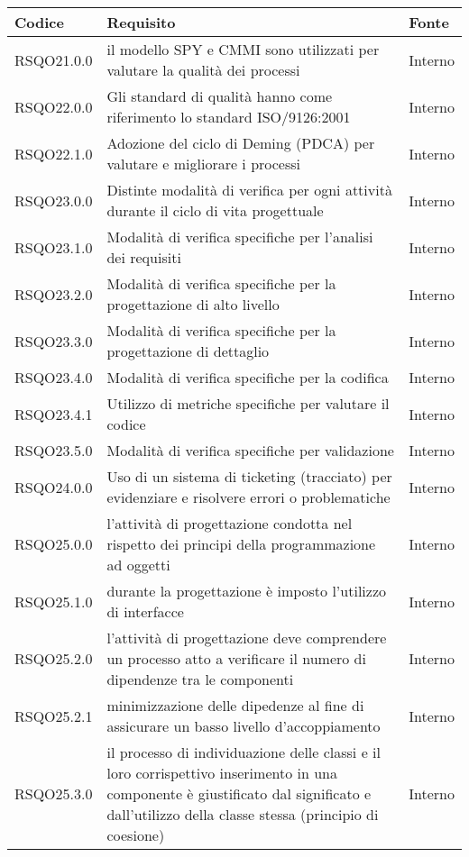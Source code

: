 \begin{center}
\begin{longtable}{lp{}l}
\toprule Codice & Requisito & Fonte\\
\midrule
RSQO21.0.0 & il modello SPY e CMMI sono utilizzati per valutare la qualità dei processi & Interno \\
RSQO22.0.0 & Gli standard di qualità hanno come riferimento lo standard ISO/9126:2001 & Interno \\
RSQO22.1.0 & Adozione del ciclo di Deming (PDCA) per valutare e migliorare i processi & Interno \\
RSQO23.0.0 & Distinte modalità di verifica per ogni attività durante il ciclo di vita progettuale & Interno \\
RSQO23.1.0 & Modalità di verifica specifiche per l'analisi dei requisiti & Interno \\
RSQO23.2.0 & Modalità di verifica specifiche per la progettazione di alto livello & Interno \\
RSQO23.3.0 & Modalità di verifica specifiche per la progettazione di dettaglio & Interno \\
RSQO23.4.0 & Modalità di verifica specifiche per la codifica & Interno \\
RSQO23.4.1 & Utilizzo di metriche specifiche per valutare il codice & Interno \\
RSQO23.5.0 & Modalità di verifica specifiche per validazione & Interno \\
RSQO24.0.0 & Uso di un sistema di ticketing (tracciato) per evidenziare e risolvere errori o problematiche & Interno \\
RSQO25.0.0 & l'attività di progettazione condotta nel rispetto dei principi della programmazione ad oggetti & Interno \\
RSQO25.1.0 & durante la progettazione è imposto l'utilizzo di interfacce & Interno \\
RSQO25.2.0 & l'attività di progettazione deve comprendere un processo atto a verificare il numero di dipendenze tra le componenti & Interno \\
RSQO25.2.1 & minimizzazione delle dipedenze al fine di assicurare un basso livello d'accoppiamento & Interno \\
RSQO25.3.0 & il processo di individuazione delle classi e il loro corrispettivo inserimento in una componente è giustificato dal significato e dall'utilizzo della classe stessa (principio di coesione) & Interno \\
\bottomrule
\end{longtable}
\end{center}

